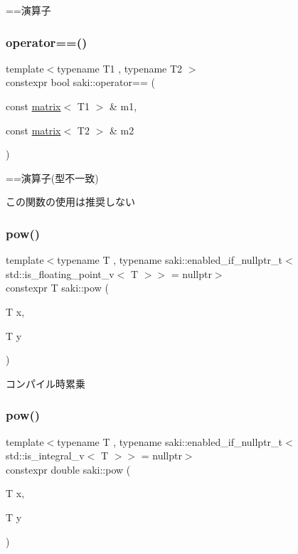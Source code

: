 ==演算子 

\mbox{\label{namespacesaki_a1ffbf8122dda5209dc384e64747bec32}} 
\subsubsection{\texorpdfstring{operator==()}{operator==()}\hspace{0.1cm}{\footnotesize\ttfamily [11/11]}}
{\footnotesize\ttfamily template$<$typename T1 , typename T2 $>$ \\
constexpr bool saki\+::operator== (\begin{DoxyParamCaption}\item[{const \mbox{\hyperlink{classsaki_1_1matrix}{matrix}}$<$ T1 $>$ \&}]{m1,  }\item[{const \mbox{\hyperlink{classsaki_1_1matrix}{matrix}}$<$ T2 $>$ \&}]{m2 }\end{DoxyParamCaption})}



==演算子(型不一致) 

この関数の使用は推奨しない \mbox{\label{namespacesaki_aa5b66f18d7c8c94b4c50731449ed3240}} 
\subsubsection{\texorpdfstring{pow()}{pow()}\hspace{0.1cm}{\footnotesize\ttfamily [1/3]}}
{\footnotesize\ttfamily template$<$typename T , typename saki\+::enabled\+\_\+if\+\_\+nullptr\+\_\+t$<$ std\+::is\+\_\+floating\+\_\+point\+\_\+v$<$ T $>$$>$  = nullptr$>$ \\
constexpr T saki\+::pow (\begin{DoxyParamCaption}\item[{T}]{x,  }\item[{T}]{y }\end{DoxyParamCaption})}



コンパイル時累乗 

\mbox{\label{namespacesaki_a53b0e93733e85d7c6ab17aea25072536}} 
\subsubsection{\texorpdfstring{pow()}{pow()}\hspace{0.1cm}{\footnotesize\ttfamily [2/3]}}
{\footnotesize\ttfamily template$<$typename T , typename saki\+::enabled\+\_\+if\+\_\+nullptr\+\_\+t$<$ std\+::is\+\_\+integral\+\_\+v$<$ T $>$$>$  = nullptr$>$ \\
constexpr double saki\+::pow (\begin{DoxyParamCaption}\item[{T}]{x,  }\item[{T}]{y }\end{DoxyParamCaption})}



